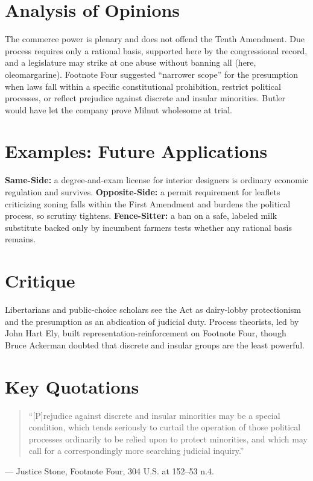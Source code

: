 \documentclass[12pt]{article}
\begin{document}
\section{Analysis of Opinions}
The commerce power is plenary and does not offend the Tenth Amendment. Due process requires only a rational basis, supported here by the congressional record, and a legislature may strike at one abuse without banning all (here, oleomargarine). Footnote Four suggested ``narrower scope'' for the presumption when laws fall within a specific constitutional prohibition, restrict political processes, or reflect prejudice against discrete and insular minorities. Butler would have let the company prove Milnut wholesome at trial.

\section{Examples: Future Applications}
\textbf{Same-Side:} a degree-and-exam license for interior designers is ordinary economic regulation and survives. \textbf{Opposite-Side:} a permit requirement for leaflets criticizing zoning falls within the First Amendment and burdens the political process, so scrutiny tightens. \textbf{Fence-Sitter:} a ban on a safe, labeled milk substitute backed only by incumbent farmers tests whether any rational basis remains.

\section{Critique}
Libertarians and public-choice scholars see the Act as dairy-lobby protectionism and the presumption as an abdication of judicial duty. Process theorists, led by John Hart Ely, built representation-reinforcement on Footnote Four, though Bruce Ackerman doubted that discrete and insular groups are the least powerful.

\section{Key Quotations}
\begin{quote}
``[P]rejudice against discrete and insular minorities may be a special condition, which tends seriously to curtail the operation of those political processes ordinarily to be relied upon to protect minorities, and which may call for a correspondingly more searching judicial inquiry.''
\end{quote}
\noindent --- Justice Stone, Footnote Four, 304 U.S. at 152--53 n.4.
\end{document}
